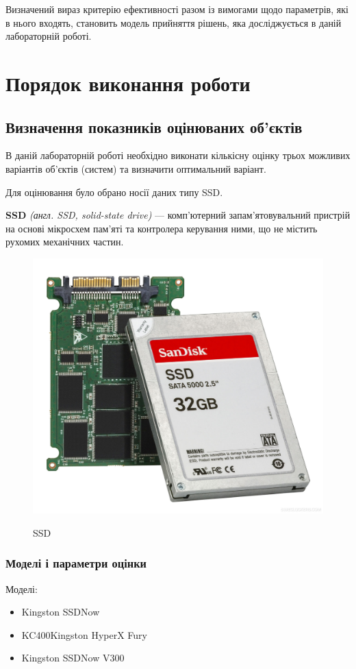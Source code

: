 Визначений вираз критерію ефективності разом із вимогами щодо параметрів, які в нього входять,
становить модель прийняття рішень, яка досліджується в даній лабораторній роботі.

\newpage
\section{Порядок виконання роботи}

\subsection{Визначення показників оцінюваних об’єктів}

В даній лабораторній роботі необхідно виконати кількісну оцінку трьох можливих варіантів об’єктів
(систем) та визначити оптимальний варіант.

Для оцінювання було обрано носії даних типу SSD.

\textbf{SSD} \textit{(англ. SSD, solid-state drive)} --- комп'ютерний запам'ятовувальний пристрій на
основі мікросхем пам'яті та контролера керування ними, що не містить рухомих механічних частин.
\begin{figure}[!ht]
  \centering
  \includegraphics[width=0.7\linewidth]{images/lab1/ssd.jpg}
  \label{f:ssd} 
  \caption{SSD}
\end{figure}

\subsubsection{Моделі і параметри оцінки}

Моделі:
\begin{itemize}
\item Kingston SSDNow
\item KC400Kingston HyperX Fury
\item Kingston SSDNow V300
\end{itemize}

